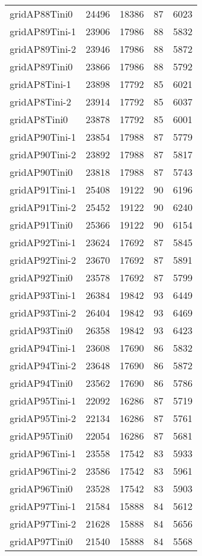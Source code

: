 \begin{longtable}{lrrrr}
gridAP88Tini0 & 24496 & 18386 & 87 & 6023 \\
gridAP89Tini-1 & 23906 & 17986 & 88 & 5832 \\
gridAP89Tini-2 & 23946 & 17986 & 88 & 5872 \\
gridAP89Tini0 & 23866 & 17986 & 88 & 5792 \\
gridAP8Tini-1 & 23898 & 17792 & 85 & 6021 \\
gridAP8Tini-2 & 23914 & 17792 & 85 & 6037 \\
gridAP8Tini0 & 23878 & 17792 & 85 & 6001 \\
gridAP90Tini-1 & 23854 & 17988 & 87 & 5779 \\
gridAP90Tini-2 & 23892 & 17988 & 87 & 5817 \\
gridAP90Tini0 & 23818 & 17988 & 87 & 5743 \\
gridAP91Tini-1 & 25408 & 19122 & 90 & 6196 \\
gridAP91Tini-2 & 25452 & 19122 & 90 & 6240 \\
gridAP91Tini0 & 25366 & 19122 & 90 & 6154 \\
gridAP92Tini-1 & 23624 & 17692 & 87 & 5845 \\
gridAP92Tini-2 & 23670 & 17692 & 87 & 5891 \\
gridAP92Tini0 & 23578 & 17692 & 87 & 5799 \\
gridAP93Tini-1 & 26384 & 19842 & 93 & 6449 \\
gridAP93Tini-2 & 26404 & 19842 & 93 & 6469 \\
gridAP93Tini0 & 26358 & 19842 & 93 & 6423 \\
gridAP94Tini-1 & 23608 & 17690 & 86 & 5832 \\
gridAP94Tini-2 & 23648 & 17690 & 86 & 5872 \\
gridAP94Tini0 & 23562 & 17690 & 86 & 5786 \\
gridAP95Tini-1 & 22092 & 16286 & 87 & 5719 \\
gridAP95Tini-2 & 22134 & 16286 & 87 & 5761 \\
gridAP95Tini0 & 22054 & 16286 & 87 & 5681 \\
gridAP96Tini-1 & 23558 & 17542 & 83 & 5933 \\
gridAP96Tini-2 & 23586 & 17542 & 83 & 5961 \\
gridAP96Tini0 & 23528 & 17542 & 83 & 5903 \\
gridAP97Tini-1 & 21584 & 15888 & 84 & 5612 \\
gridAP97Tini-2 & 21628 & 15888 & 84 & 5656 \\
gridAP97Tini0 & 21540 & 15888 & 84 & 5568 \\

\end{longtable}
